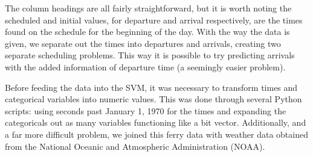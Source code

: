 \documentclass[11pt]{article} %
\begin{document}
The column headings are all fairly straightforward, but it is worth noting the
scheduled and initial values, for departure and arrival respectively, are the
times found on the schedule for the beginning of the day. With the way the data
is given, we separate out the times into departures and arrivals, creating two
separate scheduling problems. This way it is possible to try predicting arrivals
with the added information of departure time (a seemingly easier problem). 

Before feeding the data into the SVM, it was necessary to transform times and 
categorical variables into numeric values. This was done through several Python
scripts: using seconds past January 1, 1970 for the times and expanding the 
categoricals out as many variables functioning like a bit vector. Additionally,
and a far more difficult problem, we joined this ferry data with weather data
obtained from the National Oceanic and Atmospheric Administration (NOAA).

% 
% 
\end{document}
